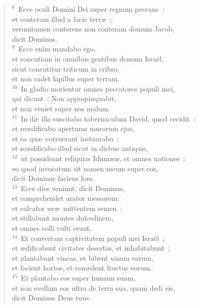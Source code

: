 \begin{flushleft}\begin{verse}${}^{8}$~Ecce oculi Domini Dei super regnum peccans~:\\ et conteram illud a facie terr\ae~;\\ verumtamen conterens non conteram domum Jacob,\\ dicit Dominus.\\
${}^{9}$~Ecce enim mandabo ego,\\ et concutiam in omnibus gentibus domum Isra\"el,\\ sicut concutitur triticum in cribro,\\ et non cadet lapillus super terram.\\
${}^{10}$~In gladio morientur omnes peccatores populi mei,\\ qui dicunt~: Non appropinquabit,\\ et non veniet super nos malum.\\
${}^{11}$~In die illa suscitabo tabernaculum David, quod cecidit~:\\ et re\ae dificabo aperturas murorum ejus,\\ et ea qu\ae\ corruerant instaurabo~:\\ et re\ae dificabo illud sicut in diebus antiquis,\\
${}^{12}$~ut possideant reliquias Idum\ae \ae , et omnes nationes~:\\ eo quod invocatum sit nomen meum super eos,\\ dicit Dominus faciens h\ae c.\\
${}^{13}$~Ecce dies veniunt, dicit Dominus,\\ et comprehendet arator messorem,\\ et calcator uv\ae\ mittentem semen~:\\ et stillabunt montes dulcedinem,\\ et omnes colli culti erunt.\\
${}^{14}$~Et convertam captivitatem populi mei Isra\"el~;\\ et \ae dificabunt civitates desertas, et inhabitabunt~;\\ et plantabunt vineas, et bibent vinum earum,\\ et facient hortos, et comedent fructus eorum.\\
${}^{15}$~Et plantabo eos super humum suam,\\ et non evellam eos ultra de terra sua, quam dedi eis,\\ dicit Dominus Deus tuus.\end{verse}\end{flushleft}



